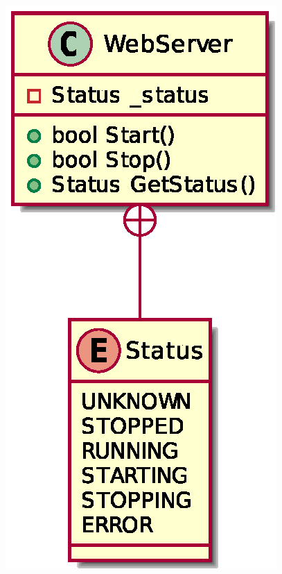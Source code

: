 \begin{DoxyImageNoCaption}
  \mbox{\includegraphics[width=\textwidth,height=\textheight/2,keepaspectratio=true]{inline_umlgraph_2}}
\end{DoxyImageNoCaption}
 

